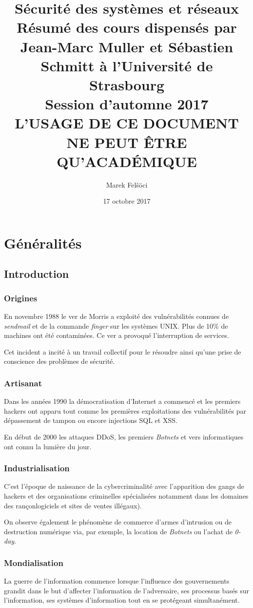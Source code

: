\documentclass[12pt, a4paper]{article}
\title{
  \textbf{Sécurité des systèmes et réseaux} \\
  \Large Résumé des cours dispensés par Jean-Marc Muller et Sébastien Schmitt à
	l'Université de Strasbourg \\
  \large Session d'automne 2017 \\
  \huge L'USAGE DE CE DOCUMENT NE PEUT ÊTRE QU'ACADÉMIQUE
}
\author{Marek Felšöci}
\date{17 octobre 2017}
\begin{document}
	\maketitle
	\section{Généralités}
	\subsection{Introduction}
	\subsubsection{Origines}
	En novembre 1988 le ver de Morris a exploité des vulnérabilités connues de
	\textit{sendmail} et de la commande \textit{finger} sur les systèmes UNIX.
	Plus de 10\% de machines ont été contaminées. Ce ver a provoqué l'interruption
	 de services.
	\par
	Cet incident a incité à un travail collectif pour le résoudre ainsi qu'une
	prise de conscience des problèmes de sécurité.
	\subsubsection{Artisanat}
	Dans les années 1990 la démocratisation d'Internet a commencé et les premiers
	hackers ont apparu tout comme les premières exploitations des vulnérabilités
	par dépassement de tampon ou encore injections SQL et XSS.
	\par
	En début de 2000 les attaques DDoS, les premiers \textit{Botnets} et vers
	informatiques ont connu la lumière du jour.
	\subsubsection{Industrialisation}
	C'est l'époque de naissance de la cybercriminalité avec l'apparition des gangs
	 de hackers et des organisations criminelles spécialisées notamment dans les
	domaines des rançonlogiciels et sites de ventes illégaux).
	\par
	On observe également le phénomène de commerce d'armes d'intrusion ou de
	destruction numérique via, par exemple, la location de \textit{Botnets} ou
	l'achat de \textit{0-day}.
	\subsubsection{Mondialisation}
	La guerre de l'information commence lorsque l'influence des gouvernements
	grandit dans le but d'affecter l'information de l'adversaire, ses processus
	basés sur l'information, ses systèmes d'information tout en se protégeant
	simultanément.
\end{document}
